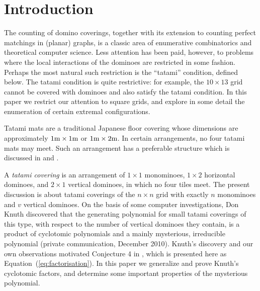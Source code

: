 \documentclass[12pt]{amsart}
\newcommand{\eref}[1]{Equation~(\ref{eq:#1})}
\begin{document}

\section{Introduction}
The counting of domino coverings, together with its extension to
counting perfect matchings in (planar) graphs, is a classic area of
enumerative combinatorics and theoretical computer science.  Less
attention has been paid, however, to problems where the local
interactions of the dominoes are restricted in some fashion.  Perhaps
the most natural such restriction is the ``tatami'' condition, defined
below.  The tatami condition is quite restrictive: for example, the
$10\times 13$ grid cannot be covered with dominoes and also satisfy
the tatami condition.  In this paper we restrict our attention to
square grids, and explore in some detail the enumeration of certain
extremal configurations.

Tatami mats are a traditional Japanese floor covering whose dimensions
are approximately $1\textup{m} \times 1\textup{m}$ or
$1\textup{m}\times
2\textup{m}$. %
In certain arrangements, no four tatami mats may meet.  Such an
arrangement has a preferable structure which is discussed in
\cite{EricksonRuskeySchurch2011} and \cite{EricksonSchurch2012}.

A \emph{tatami covering} is an arrangement of $1\times 1$ monominoes,
$1\times 2$ horizontal dominoes, and $2\times 1$ vertical dominoes, in
which no four tiles meet.  The present discussion is about tatami
coverings of the $n\times n$ grid with exactly $n$ monominoes and $v$
vertical dominoes.  On the basis of some computer investigations, Don
Knuth discovered that the generating polynomial for small tatami
coverings of this type, with respect to the number of vertical
dominoes they contain, is a product of cyclotomic polynomials and a
mainly mysterious, irreducible polynomial (private communication,
December 2010). Knuth's discovery and our own observations motivated
Conjecture 4 in \cite{EricksonRuskeySchurch2011}, which is presented
here as \eref{factorisation}.  In this paper we generalize and prove
Knuth's cyclotomic factors, and determine some important properties of
the mysterious polynomial.
\end{document}
